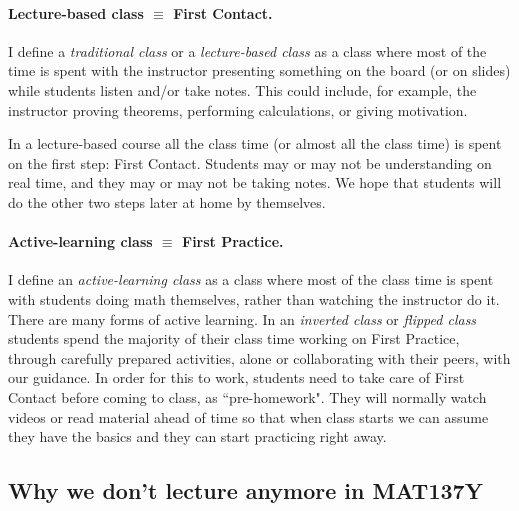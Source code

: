 \documentclass[11pt]{article}
\begin{document}
\paragraph{Lecture-based class $\equiv$ First Contact.}
I define a \emph{traditional class} or a \emph{lecture-based class} as a class where most of the time is spent with the instructor presenting something on the board (or on slides) while students listen and/or take notes.    This could include, for example, the instructor proving theorems, performing calculations, or giving motivation.

{\baselineskip
In a lecture-based course all the class time (or almost all the class time) is spent on the first step: First Contact.    Students may or may not be understanding on real time, and they may or may not be taking notes.  We hope that students will do the other two steps later at home by themselves.  
}

\paragraph{Active-learning class $\equiv$ First Practice.} I define an \emph{active-learning class} as a class where most of the class time is spent with students doing math themselves, rather than watching the instructor do it.  There are many forms of active learning.  In an \emph{\textcolor{137cp1}{inverted class}} or \emph{\textcolor{137cp1}{flipped class}} students spend the majority of their class time working on First Practice, through carefully prepared activities, alone or collaborating with their peers, with our guidance.    In order for this to work, students need to take care of First Contact before coming to class, as ``pre-homework".    They will normally watch videos or read material ahead of time so that when class starts we can assume they have the basics and they can start practicing right away.


\newpage

\subsection{Why we don't lecture anymore in MAT137Y} \label{sec:nolec}
\end{document}
